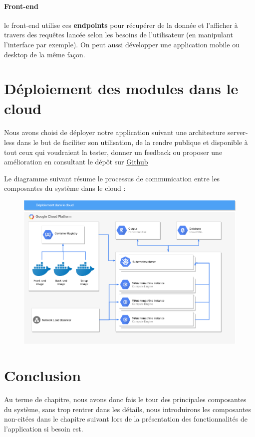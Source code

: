 \documentclass[]{report}
\begin{document}
			\paragraph{Front-end}
			le front-end utilise ces \textbf{endpoints} pour récupérer de la donnée et l'afficher à travers des requêtes lancée selon les besoins de l'utilisateur (en manipulant l'interface par exemple).
			On peut aussi développer une application mobile ou desktop de la même façon.   	
	\section{Déploiement des modules dans le cloud}
		\paragraph{}
		Nous avons choisi de déployer notre application suivant une architecture server-less dans le but de faciliter son utilisation, de la rendre publique et disponible à tout ceux qui voudraient la tester, donner un feedback ou proposer une amélioration en consultant le dépôt sur \href{https://github.com/mohammedi-haroune/arabic-historical-dictionary-frontend}{Github}
		\par 
		Le diagramme suivant résume le processus de communication entre les composantes du système dans le cloud : 
		\begin{figure}[H]
			\centering
			\includegraphics[width=0.75\linewidth]{images/cloud_schema.png}
		\end{figure}
	\section{Conclusion}
		\paragraph{}
		Au terme de chapitre, nous avons donc fais le tour des principales composantes du système, sans trop rentrer dans les détails, nous introduirons les composantes non-citées dans le chapitre suivant lors de la présentation des fonctionnalités de l'application si besoin est.  
\end{document}
